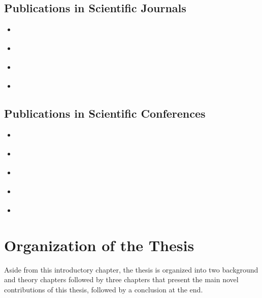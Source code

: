 \subsection{Publications in Scientific Journals}

\begin{itemize}
	\item \cite{bencevicTrainingPolarImage2021} 
	\item \cite{bencevicRecentProgressEpicardial2022} 
	\item \cite{bencevicSegmentthenSegmentContextPreservingCropBased2023a} 
	\item \cite{bencevicUnderstandingSkinColor2024} 
\end{itemize}

\subsection{Publications in Scientific Conferences}

\begin{itemize}
	\item \cite{bencevicEpicardialAdiposeTissue2021} 
	\item \cite{bencevicUsingPolarTransform2022} 
	\item \cite{bencevicSelfsupervisedLearningMeans2022} 
	\item \cite{verchevalCounterfactualFunctionalConnectomes2023} 
	\item \cite{bencevicCropGuidedNeuralNetwork2024} 
\end{itemize}


\section{Organization of the Thesis}

Aside from this introductory chapter, the thesis is organized into two background and theory chapters followed by three chapters that present the main novel contributions of this thesis, followed by a conclusion at the end.

